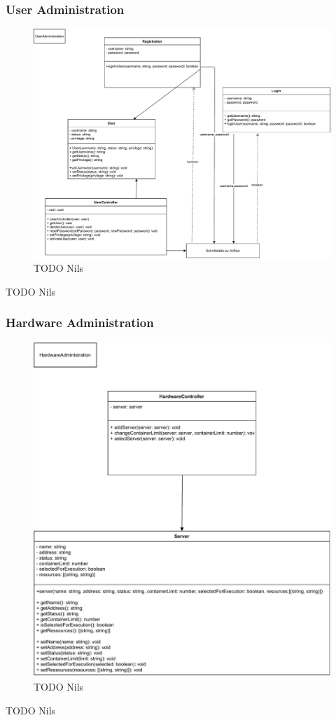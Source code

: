 \subsubsection{User Administration}
\begin{figure}[H]
    \includegraphics[width=1\textwidth]{res/UserAdministration.pdf}
    \caption{TODO Nils}
\end{figure}
TODO Nils

\subsubsection{Hardware Administration}
\begin{figure}[H]
    \includegraphics[width=1\textwidth]{res/HardwareAdministration.pdf}
    \caption{TODO Nils}
\end{figure}
TODO Nils

